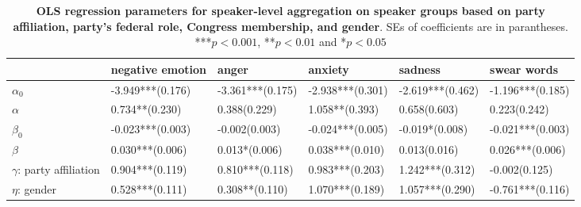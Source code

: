 \begin{table}[h]\centering
\caption{\textbf{OLS regression parameters for speaker-level aggregation on speaker groups based on party affiliation, party's federal role, Congress membership, and gender}. SEs of coefficients are in parantheses. ***$p < 0.001$, **$p < 0.01$ and *$p < 0.05$}
	\label{fig: Attributes_1}
\begin{adjustbox}{width=\linewidth, center}
	\begin{tabular}{llllll}
	\toprule
	{} &                      negative emotion &                                                     anger &                               anxiety &                                                   sadness &                                               swear words \\
	\midrule
	$\alpha_0$                     &                      -3.949***(0.176) &                                          -3.361***(0.175) &                      -2.938***(0.301) &                                          -2.619***(0.462) &                                          -1.196***(0.185) \\
	$\alpha$                       &  \phantom{-}0.734**\phantom{*}(0.230) &  \phantom{-}0.388\phantom{*}\phantom{*}\phantom{*}(0.229) &  \phantom{-}1.058**\phantom{*}(0.393) &  \phantom{-}0.658\phantom{*}\phantom{*}\phantom{*}(0.603) &  \phantom{-}0.223\phantom{*}\phantom{*}\phantom{*}(0.242) \\
	$\beta_0$                      &                      -0.023***(0.003) &            -0.002\phantom{*}\phantom{*}\phantom{*}(0.003) &                      -0.024***(0.005) &                      -0.019*\phantom{*}\phantom{*}(0.008) &                                          -0.021***(0.003) \\
	$\beta$                        &            \phantom{-}0.030***(0.006) &            \phantom{-}0.013*\phantom{*}\phantom{*}(0.006) &            \phantom{-}0.038***(0.010) &  \phantom{-}0.013\phantom{*}\phantom{*}\phantom{*}(0.016) &                                \phantom{-}0.026***(0.006) \\
	$\gamma$: party affiliation    &            \phantom{-}0.904***(0.119) &                                \phantom{-}0.810***(0.118) &            \phantom{-}0.983***(0.203) &                                \phantom{-}1.242***(0.312) &            -0.002\phantom{*}\phantom{*}\phantom{*}(0.125) \\
	$\eta$: gender                 &            \phantom{-}0.528***(0.111) &                      \phantom{-}0.308**\phantom{*}(0.110) &            \phantom{-}1.070***(0.189) &                                \phantom{-}1.057***(0.290) &                                          -0.761***(0.116) \\

\end{tabular}
\end{adjustbox}
\end{table}
